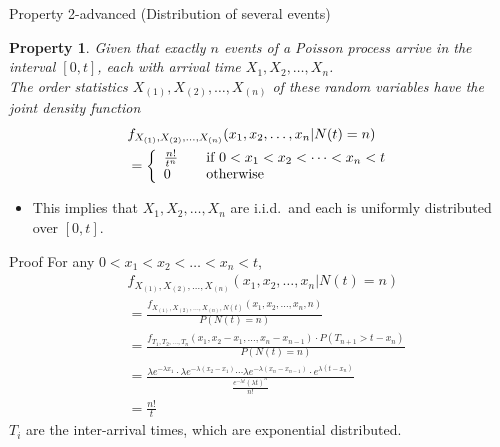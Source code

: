 \documentclass[mathserif]{beamer}
\newtheorem{pty}{Property}
\begin{document}
\begin{frame}{Property 2-advanced (Distribution of several events)}
\begin{pty}
Given that exactly $n$ events of a Poisson process arrive in the interval $[0,t]$,
each with arrival time $X_1, X_2, \ldots, X_n$.\\
The order statistics $X_{(1)}, X_{(2)}, \ldots, X_{(n)}$ of these random variables have the joint density function
\begin{align*}
& f_{X_{(1)}, X_{(2)}, \ldots, X_{(n)}}(x_1, x_2, \ldots, x_n | N(t)=n) \\
& = \left\{
\begin{array}{l l}
\frac{n!}{t^n} & \quad\text{if } 0 < x_1 < x_2 < \cdots < x_n < t \\
0 & \quad\text{otherwise} \\
\end{array}
\right.
\end{align*}
\end{pty}
\begin{itemize}
\item This implies that $X_1, X_2, \ldots, X_n$ are i.i.d.\ and each is uniformly distributed over $[0,t]$.
\end{itemize}
\end{frame}

\begin{frame}{Proof}
For any $0 < x_1 < x_2 < \ldots < x_n < t$,
\begin{align*}
& f_{X_{(1)}, X_{(2)}, \ldots, X_{(n)}}(x_1, x_2, \ldots, x_n | N(t)=n) \\
& = \frac{f_{X_{(1)}, X_{(2)}, \ldots, X_{(n)}, N(t)}(x_1, x_2, \ldots, x_n, n)}{P(N(t) = n)} \\
& = \frac{f_{T_1, T_2, \ldots, T_n}(x_1, x_2 - x_1, \ldots, x_n - x_{n-1})\cdot P(T_{n+1} > t - x_n)}{P(N(t) = n)} \\
& = \frac{\lambda e^{-\lambda x_1}\cdot\lambda e^{-\lambda(x_2-x_1)}\cdots\lambda e^{-\lambda(x_n-x_{n-1})}\cdot e^{\lambda(t-x_n)}}{\frac{e^{-\lambda t}(\lambda t)^n}{n!}} \\
& = \frac{n!}{t}
\end{align*}
$T_i$ are the inter-arrival times, which are exponential distributed.
\end{frame}
\end{document}
